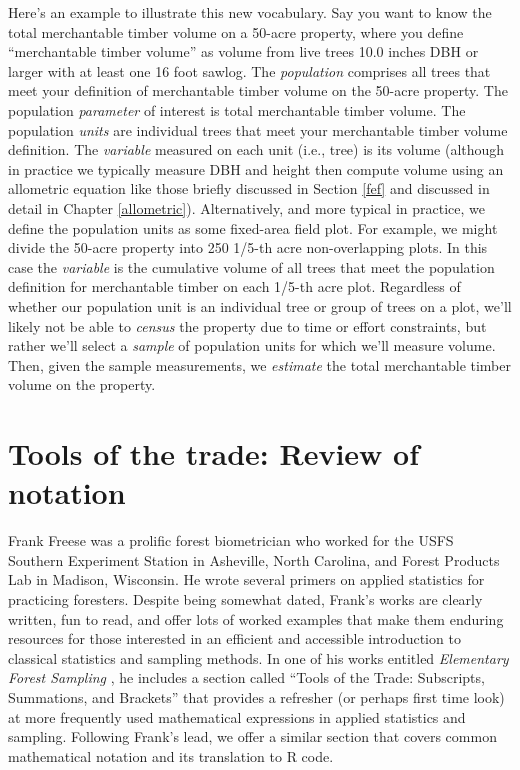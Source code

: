 \documentclass[
  11pt,
]{krantz}
\theoremstyle{definition}
\theoremstyle{definition}
\theoremstyle{definition}
\theoremstyle{definition}
\theoremstyle{remark}
\begin{document}
Here's an example to illustrate this new vocabulary. Say you want to know the total merchantable timber volume on a 50-acre property, where you define ``merchantable timber volume'' as volume from live trees 10.0 inches DBH or larger with at least one 16 foot sawlog. The \emph{population} comprises all trees that meet your definition of merchantable timber volume on the 50-acre property. The population \emph{parameter} of interest is total merchantable timber volume. The population \emph{units} are individual trees that meet your merchantable timber volume definition. The \emph{variable} measured on each unit (i.e., tree) is its volume (although in practice we typically measure DBH and height then compute volume using an allometric equation like those briefly discussed in Section \ref{fef} and discussed in detail in Chapter \ref{allometric}). Alternatively, and more typical in practice, we define the population units as some fixed-area field plot. For example, we might divide the 50-acre property into 250 1/5-th acre non-overlapping plots. In this case the \emph{variable} is the cumulative volume of all trees that meet the population definition for merchantable timber on each 1/5-th acre plot. Regardless of whether our population unit is an individual tree or group of trees on a plot, we'll likely not be able to \emph{census} the property due to time or effort constraints, but rather we'll select a \emph{sample} of population units for which we'll measure volume. Then, given the sample measurements, we \emph{estimate} the total merchantable timber volume on the property.

\hypertarget{tools}{%
\section{Tools of the trade: Review of notation}\label{tools}}

Frank Freese was a prolific forest biometrician who worked for the USFS Southern Experiment Station in Asheville, North Carolina, and Forest Products Lab in Madison, Wisconsin. He wrote several primers on applied statistics for practicing foresters. Despite being somewhat dated, Frank's works are clearly written, fun to read, and offer lots of worked examples that make them enduring resources for those interested in an efficient and accessible introduction to classical statistics and sampling methods. In one of his works entitled \emph{Elementary Forest Sampling} \citep{freese1962}, he includes a section called ``Tools of the Trade: Subscripts, Summations, and Brackets'' that provides a refresher (or perhaps first time look) at more frequently used mathematical expressions in applied statistics and sampling. Following Frank's lead, we offer a similar section that covers common mathematical notation and its translation to R code.
\end{document}
